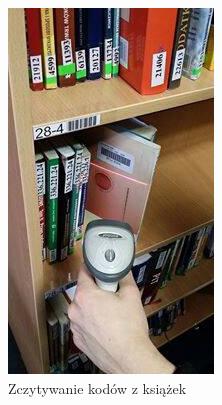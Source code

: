 \begin{figure}[H]
\begin{center}
\includegraphics[scale=0.7]{czlonkowie/1/b1.jpg}
\caption{Zczytywanie kodów z książek}
\end{center}
\end{figure}

